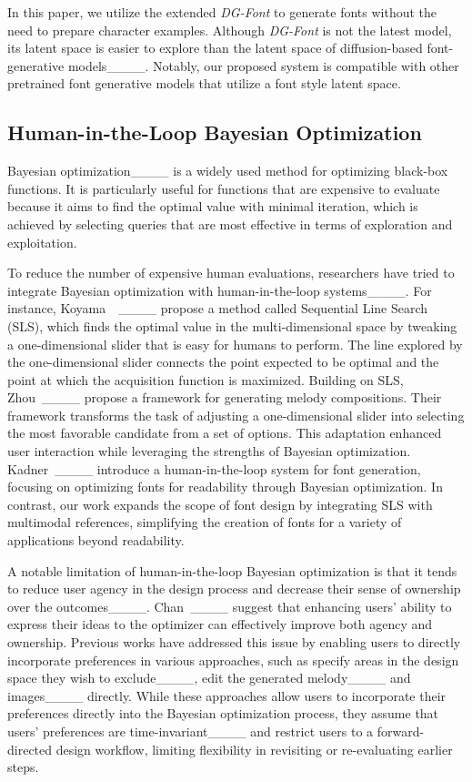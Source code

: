 In this paper, we utilize the extended \textit{DG-Font} to generate fonts without the need to prepare character examples.
Although \textit{DG-Font} is not the latest model, its latent space is easier to explore than the latent space of diffusion-based font-generative models____.
Notably, our proposed system is compatible with other pretrained font generative models that utilize a font style latent space.

\subsection{Human-in-the-Loop Bayesian Optimization}
Bayesian optimization____ is a widely used method for optimizing black-box functions.
It is particularly useful for functions that are expensive to evaluate because it aims to find the optimal value with minimal iteration, which is achieved by selecting queries that are most effective in terms of exploration and exploitation.

To reduce the number of expensive human evaluations, researchers have tried to integrate Bayesian optimization with human-in-the-loop systems____.
For instance, Koyama~\etal\ ____ propose a method called Sequential Line Search (SLS), which finds the optimal value in the multi-dimensional space by tweaking a one-dimensional slider that is easy for humans to perform.
The line explored by the one-dimensional slider connects the point expected to be optimal and the point at which the acquisition function is maximized.
Building on SLS, Zhou~\etal____ propose a framework for generating melody compositions.
Their framework transforms the task of adjusting a one-dimensional slider into selecting the most favorable candidate from a set of options.
This adaptation enhanced user interaction while leveraging the strengths of Bayesian optimization.
Kadner~\etal____ introduce a human-in-the-loop system for font generation, focusing on optimizing fonts for readability through Bayesian optimization.
In contrast, our work expands the scope of font design by integrating SLS with multimodal references, simplifying the creation of fonts for a variety of applications beyond readability.

A notable limitation of human-in-the-loop Bayesian optimization is that it tends to reduce user agency in the design process and decrease their sense of ownership over the outcomes____.
Chan~\etal____ suggest that enhancing users' ability to express their ideas to the optimizer can effectively improve both agency and ownership.
Previous works have addressed this issue by enabling users to directly incorporate preferences in various approaches, such as specify areas in the design space they wish to exclude____, edit the generated melody____ and images____ directly.
While these approaches allow users to incorporate their preferences directly into the Bayesian optimization process, they assume that users' preferences are time-invariant____ and restrict users to a forward-directed design workflow, limiting flexibility in revisiting or re-evaluating earlier steps.

